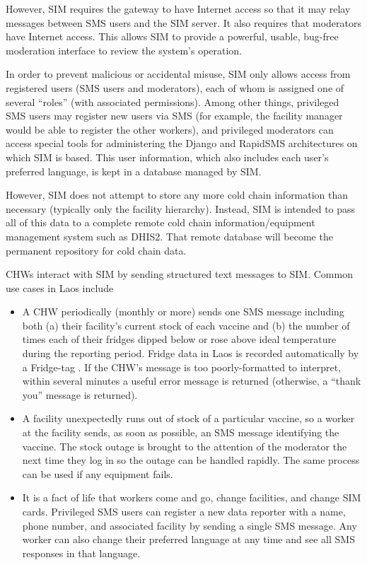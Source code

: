 \documentclass{acm_proc_article-sp}
\begin{document}
However, SIM requires the gateway to have Internet access so that it may relay messages between SMS users and the SIM server. It also requires that moderators have Internet access. This allows SIM to provide a powerful, usable, bug-free moderation interface to review the system's operation.

In order to prevent malicious or accidental misuse, SIM only allows access from registered users (SMS users and moderators), each of whom is assigned one of several ``roles'' (with associated permissions). Among other things, privileged SMS users may register new users via SMS (for example, the facility manager would be able to register the other workers), and privileged moderators can access special tools for administering the Django and RapidSMS architectures on which SIM is based. This user information, which also includes each user's preferred language, is kept in a database managed by SIM.

However, SIM does not attempt to store any more cold chain information than necessary (typically only the facility hierarchy). Instead, SIM is intended to pass all of this data to a complete remote cold chain information/equipment management system such as DHIS2. That remote database will become the permanent repository for cold chain data.

CHWs interact with SIM by sending structured text messages to SIM. Common use cases in Laos include

\begin{itemize}
\item A CHW periodically (monthly or more) sends one SMS message including both (a) their facility's current stock of each vaccine and (b) the number of times each of their fridges dipped below or rose above ideal temperature during the reporting period. Fridge data in Laos is recorded automatically by a Fridge-tag \textsuperscript{\textregistered} \cite{fridgetag}. If the CHW's message is too poorly-formatted to interpret, within several minutes a useful error message is returned (otherwise, a ``thank you'' message is returned).
\item A facility unexpectedly runs out of stock of a particular vaccine, so a worker at the facility sends, as soon as possible, an SMS message identifying the vaccine. The stock outage is brought to the attention of the moderator the next time they log in so the outage can be handled rapidly. The same process can be used if any equipment fails.
\item It is a fact of life that workers come and go, change facilities, and change SIM cards. Privileged SMS users can register a new data reporter with a name, phone number, and associated facility by sending a single SMS message. Any worker can also change their preferred language at any time and see all SMS responses in that language.
\end{itemize}
\end{document}
